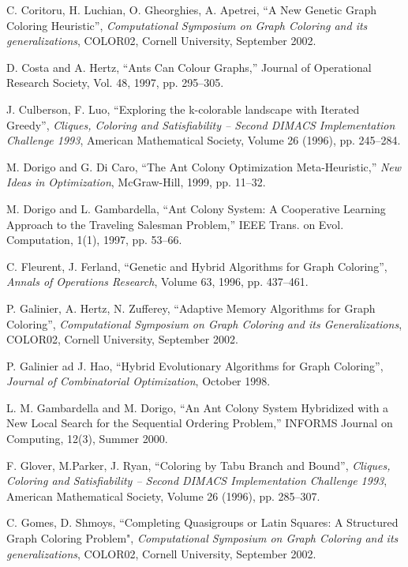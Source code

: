 \documentclass[11pt]{article}
\begin{document}
\begin{thebibliography}{99}
C. Coritoru, H. Luchian, O. Gheorghies, A. Apetrei,
``A New Genetic Graph Coloring Heuristic'',
{\it Computational Symposium on Graph Coloring and its generalizations}, 
COLOR02,
Cornell University, September 2002.

D. Costa and A. Hertz,
``Ants Can Colour Graphs,''
Journal of Operational Research Society,  Vol. 48, 1997, pp. 295--305.

J. Culberson, F. Luo,
``Exploring the k-colorable landscape with Iterated Greedy'',
{\it Cliques, Coloring and Satisfiability -- Second DIMACS Implementation
Challenge 1993}, American Mathematical Society, Volume 26 (1996), pp. 
245--284.

M. Dorigo and G. Di Caro,
``The Ant Colony Optimization Meta-Heuristic,''
{\it New Ideas in Optimization}, McGraw-Hill, 1999, pp. 11--32.


M. Dorigo and L. Gambardella,
``Ant Colony System: A Cooperative Learning Approach to the Traveling
Salesman Problem,''
IEEE Trans. on Evol. Computation, 1(1), 1997, pp. 53--66.

C. Fleurent, J. Ferland,
``Genetic and Hybrid Algorithms for Graph Coloring'',
{\it Annals of Operations Research}, Volume 63, 1996, pp. 437--461.

P. Galinier, A. Hertz, N. Zufferey,
``Adaptive Memory Algorithms for Graph Coloring'',
{\it Computational Symposium on Graph Coloring and its Generalizations}, 
COLOR02,
Cornell University, September 2002.

P. Galinier ad J. Hao,
``Hybrid Evolutionary Algorithms for Graph Coloring'',
{\it Journal of Combinatorial Optimization}, October 1998.

L. M. Gambardella and  M. Dorigo,
``An Ant Colony System Hybridized with a New Local Search for the Sequential
Ordering Problem,''
INFORMS Journal on Computing, 12(3), Summer 2000.


F. Glover, M.Parker, J. Ryan,
``Coloring by Tabu Branch and Bound'',
{\it Cliques, Coloring and Satisfiability -- Second DIMACS Implementation
Challenge 1993}, American Mathematical Society, Volume 26 (1996), pp. 
285--307.

C. Gomes, D. Shmoys,
``Completing Quasigroups or Latin Squares: A Structured Graph Coloring
Problem",
{\it Computational Symposium on Graph Coloring and its generalizations}, 
COLOR02,
Cornell University, September 2002.


\end{thebibliography}
\end{document}
